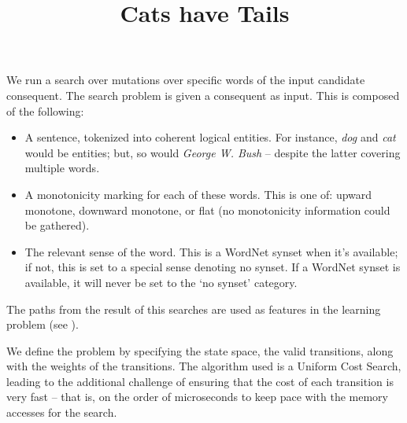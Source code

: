 \documentclass[11pt,a4paper]{article}
\title{Cats have Tails}
\author{ 
}
\date{}
\def\w#1{\textit{#1}}
\begin{document}
\maketitle


We run a search over mutations over specific words of the input candidate
  consequent.
The search problem is given a consequent as input.
This is composed of the following:

\begin{itemize}
  \item A sentence, tokenized into coherent logical entities.
        For instance, \textit{dog} and \textit{cat} would be entities;
          but, so would \textit{George W. Bush} -- despite the latter covering
          multiple words.
  \item A monotonicity marking for each of these words.
        This is one of: upward monotone, downward monotone, or flat (no
          monotonicity information could be gathered).
  \item The relevant sense of the word.
        This is a WordNet synset when it's available; if not, this is
          set to a special sense denoting no synset.
        If a WordNet synset is available, it will never be set to the
          `no synset' category.
\end{itemize}

The paths from the result of this searches are used
  as features in the learning problem
  (see ).

We define the problem by specifying the state space,
  the valid transitions, along with the weights of
  the transitions.
The algorithm used is a Uniform Cost Search, leading
  to the additional challenge of ensuring that the
  cost of each transition is very fast -- that is,
  on the order of microseconds to keep pace with
  the memory accesses for the search.

%
\end{document}
